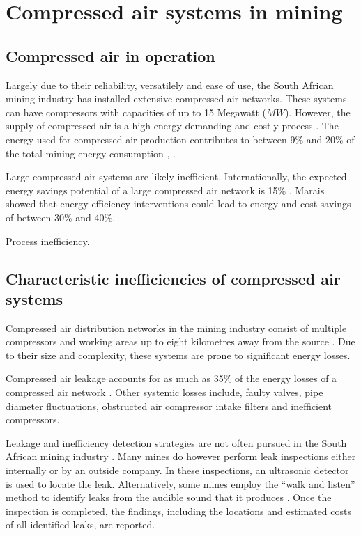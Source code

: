 \section{Compressed air systems in mining}
	\subsection{Compressed air in operation}\label{key}
		Largely due to their reliability, versatilely and ease of use, the South African mining industry has installed extensive compressed air networks. These systems can have compressors with capacities of up to 15 Megawatt ($MW$)\cite{Marais2012PhD}.
		However, the supply of compressed air is a high energy demanding and costly process \cite{padachi2009energy}. The energy used for compressed air production contributes to between 9\% and 20\% of the total mining energy consumption	\cite{Eskom2010Energy}, \cite{du2011development}. 
		\par
		Large compressed air systems are likely inefficient. Internationally, the expected energy savings potential of a large compressed air network is 15\% \cite{neale2009compressed}. Marais \cite{marais2013simplification} showed that energy efficiency interventions could lead to energy and cost savings of between 30\% and 40\%. 
		\par 
		Process inefficiency.
	 
	\subsection{Characteristic inefficiencies of compressed air systems}
		Compressed air distribution networks in the mining industry consist of multiple compressors and working areas up to eight kilometres away from the source \cite{Marais2012PhD}. Due to their size and complexity, these systems are prone to significant energy losses.
		\par 
		Compressed air leakage accounts for as much as 35\% of the energy losses of a compressed air network \cite{Lawrence2004Improving}. Other systemic losses include, faulty valves, pipe diameter fluctuations, obstructed air compressor intake filters and inefficient compressors. 	
	
		Leakage and inefficiency detection strategies are not often pursued in the South African mining industry \cite{vanTonder2010Masters}. Many mines do however perform leak inspections either internally or by an outside company. In these inspections, an ultrasonic detector is used to locate the leak. Alternatively, some mines employ the \enquote{walk and listen} method to identify leaks from the audible sound that it produces \cite{vanTonder2010Masters}. Once the inspection is completed, the findings, including the locations and estimated costs of all identified leaks, are reported.
		
